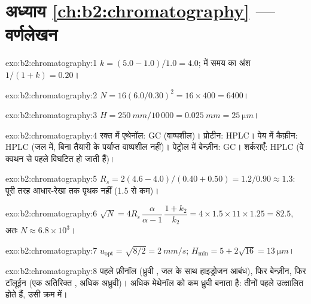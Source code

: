 \section*{अध्याय \ref{ch:b2:chromatography} --- वर्णलेखन}

\begin{solution}{exo:b2:chromatography:1}
$k = (5.0 - 1.0)/1.0 = 4.0$;  में समय का अंश $1/(1 + k) = 0.20$।
\end{solution}

\begin{solution}{exo:b2:chromatography:2}
$N = 16(6.0/0.30)^2 = 16 \times 400 = 6400$।
\end{solution}

\begin{solution}{exo:b2:chromatography:3}
$H = \qty{250}{mm}/10\,000 = \qty{0.025}{mm} = \qty{25}{\micro m}$।
\end{solution}

\begin{solution}{exo:b2:chromatography:4}
रक्त में एथेनॉल: GC (वाष्पशील)। प्रोटीन: HPLC। पेय में कैफ़ीन: HPLC (जल में, बिना तैयारी के पर्याप्त
वाष्पशील नहीं)। पेट्रोल में बेन्ज़ीन: GC। शर्कराएँ: HPLC (वे क्वथन से पहले विघटित हो जाती हैं)।
\end{solution}

\begin{solution}{exo:b2:chromatography:5}
$R_s = 2(4.6 - 4.0)/(0.40 + 0.50) = 1.2/0.90 \approx 1.3$: पूरी तरह आधार-रेखा तक पृथक नहीं (1.5 से कम)।
\end{solution}

\begin{solution}{exo:b2:chromatography:6}
$\sqrt N = 4R_s\,\dfrac{\alpha}{\alpha - 1}\,\dfrac{1 + k_2}{k_2} = 4 \times 1.5 \times 11 \times 1.25 =
82.5$, अतः $N \approx 6.8 \times 10^3$।
\end{solution}

\begin{solution}{exo:b2:chromatography:7}
$u_{\mathrm{opt}} = \sqrt{8/2} = \qty{2}{mm/s}$; $H_{\min} = 5 + 2\sqrt{16} = \qty{13}{\micro m}$।
\end{solution}

\begin{solution}{exo:b2:chromatography:8}
पहले फ़ीनॉल (ध्रुवी , जल के साथ हाइड्रोजन आबंध), फिर बेन्ज़ीन, फिर टॉलूईन (एक अतिरिक्त
, अधिक अध्रुवी)। अधिक मेथेनॉल  को कम ध्रुवी बनाता है: तीनों पहले उत्क्षालित होते हैं,
उसी क्रम में।
\end{solution}

